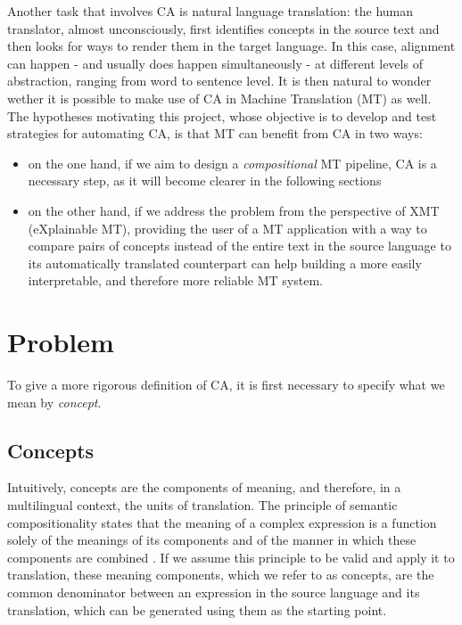 \documentclass{article}
\begin{document}
Another task that involves CA is natural language translation: the human translator, almost unconsciously, first identifies concepts in the source text and then looks for ways to render them in the target language. In this case, alignment can happen - and usually does happen simultaneously - at different levels of abstraction, ranging from word to sentence level.
It is then natural to wonder wether it is possible to make use of CA in Machine Translation (MT) as well. The hypotheses motivating this project, whose objective is to develop and test strategies for automating CA, is that MT can benefit from CA in two ways:
\begin{itemize}
    \item on the one hand, if we aim to design a \textit{compositional} MT pipeline, CA is a necessary step, as it will become clearer in the following sections
    \item on the other hand, if we address the problem from the perspective of XMT (eXplainable MT), providing the user of a MT application with a way to compare pairs of concepts instead of the entire text in the source language to its automatically translated counterpart can help building a more easily interpretable, and therefore more reliable MT system.
\end{itemize}


\section{Problem} 
To give a more rigorous definition of CA, it is first necessary to specify what we mean by \textit{concept}. 

\subsection{Concepts}
Intuitively, concepts are the components of meaning, and therefore, in a multilingual context, the units of translation. The principle of semantic compositionality states that the meaning of a complex expression is a function solely of the meanings of its components and of the manner in which these components are combined \cite{semcom}. 
If we assume this principle to be valid and apply it to translation, these meaning components, which we refer to as concepts, are the common denominator between an expression in the source language and its translation, which can be generated using them as the starting point.
\end{document}
